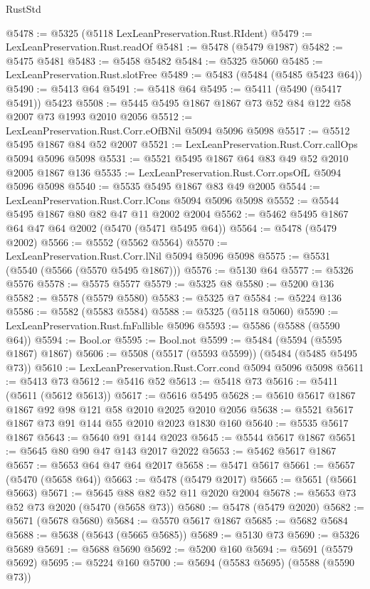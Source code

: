 \begin{lexlean}{RustStd}
\begin{coremodule}
{\begin{coremodule}
{{{{{{{{{{{{{{{{{{{{{{{{{{{{{{{@5478 := @5325 (@5118 LexLeanPreservation.Rust.RIdent)
@5479 := LexLeanPreservation.Rust.readOf
@5481 := @5478 (@5479 @1987)
@5482 := @5475 @5481
@5483 := @5458 @5482
@5484 := @5325 @5060
@5485 := LexLeanPreservation.Rust.slotFree
@5489 := @5483 (@5484 (@5485 @5423 @64))
@5490 := @5413 @64
@5491 := @5418 @64
@5495 := @5411 (@5490 (@5417 @5491)) @5423
@5508 := @5445 @5495 @1867 @1867 @73 @52 @84 @122 @58 @2007 @73 @1993 @2010 @2056
@5512 := LexLeanPreservation.Rust.Corr.eOfBNil @5094 @5096 @5098
@5517 := @5512 @5495 @1867 @84 @52 @2007
@5521 := LexLeanPreservation.Rust.Corr.callOps @5094 @5096 @5098
@5531 := @5521 @5495 @1867 @64 @83 @49 @52 @2010 @2005 @1867 @136
@5535 := LexLeanPreservation.Rust.Corr.opsOfL @5094 @5096 @5098
@5540 := @5535 @5495 @1867 @83 @49 @2005
@5544 := LexLeanPreservation.Rust.Corr.lCons @5094 @5096 @5098
@5552 := @5544 @5495 @1867 @80 @82 @47 @11 @2002 @2004
@5562 := @5462 @5495 @1867 @64 @47 @64 @2002 (@5470 (@5471 @5495 @64))
@5564 := @5478 (@5479 @2002)
@5566 := @5552 (@5562 @5564)
@5570 := LexLeanPreservation.Rust.Corr.lNil @5094 @5096 @5098
@5575 := @5531 (@5540 (@5566 (@5570 @5495 @1867)))
@5576 := @5130 @64
@5577 := @5326 @5576
@5578 := @5575 @5577
@5579 := @5325 @8
@5580 := @5200 @136
@5582 := @5578 (@5579 @5580)
@5583 := @5325 @7
@5584 := @5224 @136
@5586 := @5582 (@5583 @5584)
@5588 := @5325 (@5118 @5060)
@5590 := LexLeanPreservation.Rust.fnFallible @5096
@5593 := @5586 (@5588 (@5590 @64))
@5594 := Bool.or
@5595 := Bool.not
@5599 := @5484 (@5594 (@5595 @1867) @1867)
@5606 := @5508 (@5517 (@5593 @5599)) (@5484 (@5485 @5495 @73))
@5610 := LexLeanPreservation.Rust.Corr.cond @5094 @5096 @5098
@5611 := @5413 @73
@5612 := @5416 @52
@5613 := @5418 @73
@5616 := @5411 (@5611 (@5612 @5613))
@5617 := @5616 @5495
@5628 := @5610 @5617 @1867 @1867 @92 @98 @121 @58 @2010 @2025 @2010 @2056
@5638 := @5521 @5617 @1867 @73 @91 @144 @55 @2010 @2023 @1830 @160
@5640 := @5535 @5617 @1867
@5643 := @5640 @91 @144 @2023
@5645 := @5544 @5617 @1867
@5651 := @5645 @80 @90 @47 @143 @2017 @2022
@5653 := @5462 @5617 @1867
@5657 := @5653 @64 @47 @64 @2017
@5658 := @5471 @5617
@5661 := @5657 (@5470 (@5658 @64))
@5663 := @5478 (@5479 @2017)
@5665 := @5651 (@5661 @5663)
@5671 := @5645 @88 @82 @52 @11 @2020 @2004
@5678 := @5653 @73 @52 @73 @2020 (@5470 (@5658 @73))
@5680 := @5478 (@5479 @2020)
@5682 := @5671 (@5678 @5680)
@5684 := @5570 @5617 @1867
@5685 := @5682 @5684
@5688 := @5638 (@5643 (@5665 @5685))
@5689 := @5130 @73
@5690 := @5326 @5689
@5691 := @5688 @5690
@5692 := @5200 @160
@5694 := @5691 (@5579 @5692)
@5695 := @5224 @160
@5700 := @5694 (@5583 @5695) (@5588 (@5590 @73))
}}}}}}}}}}}}}}}}}}}}}}}}}}}}}}}
\end{coremodule}}
\end{coremodule}
\end{lexlean}
